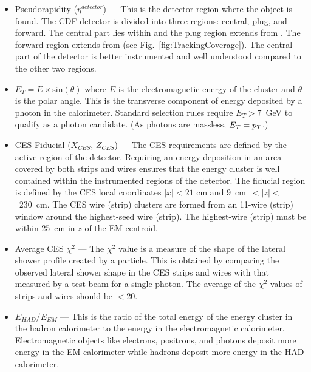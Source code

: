 \begin{singlespace}
\begin{itemize}
\item { Pseudorapidity ($\eta^{detector}$) --- This is the detector region where the object is found. The CDF detector is divided into three regions: central, plug, and forward. The central part lies within  and the plug region extends from . The forward region extends from  (see Fig.~\ref{fig:TrackingCoverage}). The central part of the detector is better instrumented and well understood compared to the other two regions.
}

\item{$E_{T}= E \times \mathrm{sin}(\theta)$ where $E$ is the electromagnetic energy of the cluster and $\theta$ is the polar angle. This is the transverse component of energy deposited by a photon in the calorimeter. Standard selection rules require $E_{T}>7$~GeV to qualify as a photon candidate. (As photons are massless, $\mbox{$E_T$}=\mbox{$p_T$}$.)
}

\item{CES Fiducial ($X_{CES}$, $Z_{CES}$) --- The CES requirements are defined by the active region of the detector. Requiring an energy deposition in an area covered by both strips and wires ensures that the energy cluster is well contained within the instrumented regions of the detector. The fiducial region is defined by the CES local coordinates $|x|<21$ cm and 9~cm~$<|z|<$~230~cm. The CES wire (strip) clusters are formed from an 11-wire (strip) window around the highest-\et seed wire (strip). The highest-\et wire (strip) must be within 25~cm in $z$ of the EM centroid.
}

\item{Average CES $\chi^2$ --- The $\chi^2$ value is a measure of the shape of the lateral shower profile created by a particle. This is obtained by comparing the observed lateral shower shape in the CES strips and wires with that measured by a test beam for a single photon. The average of the $\chi^{2}$ values of strips and wires should be $<$20.
}

\item{$E_{HAD}/E_{EM}$ --- This is the ratio of the total energy of the energy cluster in the hadron calorimeter to the energy in the electromagnetic calorimeter. Electromagnetic objects like electrons, positrons, and photons deposit more energy in the EM calorimeter while hadrons deposit more energy in the HAD calorimeter.
}


\end{itemize}
\end{singlespace}
